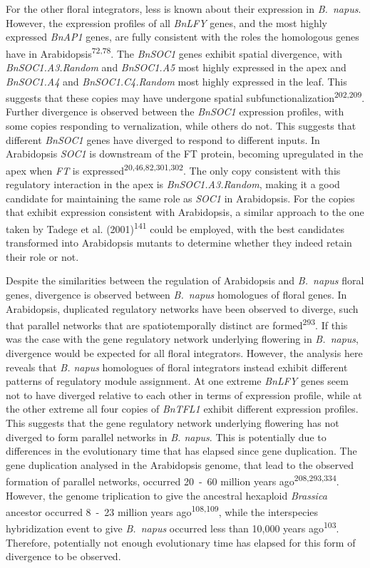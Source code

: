 \documentclass[12pt,]{book}
\begin{document}
For the other floral integrators, less is known about their expression
in \emph{B.~napus}. However, the expression profiles of all \emph{BnLFY}
genes, and the most highly expressed \emph{BnAP1} genes, are fully
consistent with the roles the homologous genes have in
Arabidopsis\textsuperscript{72,78}. The \emph{BnSOC1} genes exhibit
spatial divergence, with \emph{BnSOC1.A3.Random} and \emph{BnSOC1.A5}
most highly expressed in the apex and \emph{BnSOC1.A4} and
\emph{BnSOC1.C4.Random} most highly expressed in the leaf. This suggests
that these copies may have undergone spatial
subfunctionalization\textsuperscript{202,209}. Further divergence is
observed between the \emph{BnSOC1} expression profiles, with some copies
responding to vernalization, while others do not. This suggests that
different \emph{BnSOC1} genes have diverged to respond to different
inputs. In Arabidopsis \emph{SOC1} is downstream of the FT protein,
becoming upregulated in the apex when \emph{FT} is
expressed\textsuperscript{20,46,82,301,302}. The only copy consistent
with this regulatory interaction in the apex is \emph{BnSOC1.A3.Random},
making it a good candidate for maintaining the same role as \emph{SOC1}
in Arabidopsis. For the copies that exhibit expression consistent with
Arabidopsis, a similar approach to the one taken by Tadege et al.
(2001)\textsuperscript{141} could be employed, with the best candidates
transformed into Arabidopsis mutants to determine whether they indeed
retain their role or not.

Despite the similarities between the regulation of Arabidopsis and
\emph{B.~napus} floral genes, divergence is observed between
\emph{B.~napus} homologues of floral genes. In Arabidopsis, duplicated
regulatory networks have been observed to diverge, such that parallel
networks that are spatiotemporally distinct are
formed\textsuperscript{293}. If this was the case with the gene
regulatory network underlying flowering in \emph{B.~napus}, divergence
would be expected for all floral integrators. However, the analysis here
reveals that \emph{B. napus} homologues of floral integrators instead
exhibit different patterns of regulatory module assignment. At one
extreme \emph{BnLFY} genes seem not to have diverged relative to each
other in terms of expression profile, while at the other extreme all
four copies of \emph{BnTFL1} exhibit different expression profiles. This
suggests that the gene regulatory network underlying flowering has not
diverged to form parallel networks in \emph{B. napus}. This is
potentially due to differences in the evolutionary time that has elapsed
since gene duplication. The gene duplication analysed in the Arabidopsis
genome, that lead to the observed formation of parallel networks,
occurred 20~-~60 million years ago\textsuperscript{208,293,334}.
However, the genome triplication to give the ancestral hexaploid
\emph{Brassica} ancestor occurred 8~-~23 million years
ago\textsuperscript{108,109}, while the interspecies hybridization event
to give \emph{B.~napus} occurred less than 10,000 years
ago\textsuperscript{103}. Therefore, potentially not enough evolutionary
time has elapsed for this form of divergence to be observed.
\end{document}
